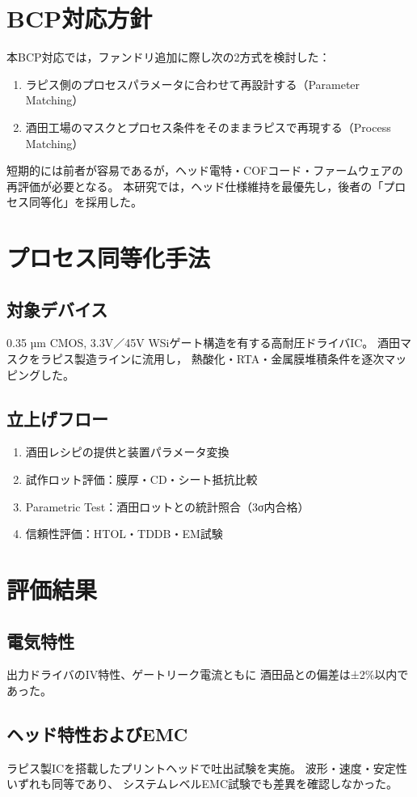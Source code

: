 \documentclass[conference]{IEEEtran}
\begin{document}
\section{BCP対応方針}
本BCP対応では，ファンドリ追加に際し次の2方式を検討した：
\begin{enumerate}
\item ラピス側のプロセスパラメータに合わせて再設計する（Parameter Matching）
\item 酒田工場のマスクとプロセス条件をそのままラピスで再現する（Process Matching）
\end{enumerate}
短期的には前者が容易であるが，ヘッド電特・COFコード・ファームウェアの再評価が必要となる。
本研究では，ヘッド仕様維持を最優先し，後者の「プロセス同等化」を採用した。

\section{プロセス同等化手法}
\subsection{対象デバイス}
0.35 µm CMOS, 3.3V／45V WSiゲート構造を有する高耐圧ドライバIC。
酒田マスクをラピス製造ラインに流用し，
熱酸化・RTA・金属膜堆積条件を逐次マッピングした。

\subsection{立上げフロー}
\begin{enumerate}
\item 酒田レシピの提供と装置パラメータ変換
\item 試作ロット評価：膜厚・CD・シート抵抗比較
\item Parametric Test：酒田ロットとの統計照合（3σ内合格）
\item 信頼性評価：HTOL・TDDB・EM試験
\end{enumerate}

\section{評価結果}
\subsection{電気特性}
出力ドライバのIV特性、ゲートリーク電流ともに
酒田品との偏差は±2\%以内であった。

\subsection{ヘッド特性およびEMC}
ラピス製ICを搭載したプリントヘッドで吐出試験を実施。
波形・速度・安定性いずれも同等であり、
システムレベルEMC試験でも差異を確認しなかった。
\end{document}

